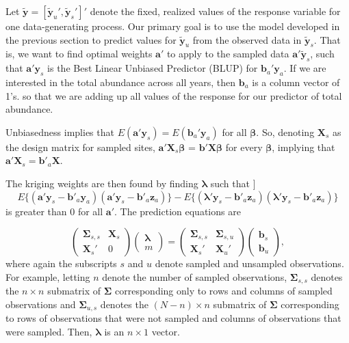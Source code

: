 \documentclass[]{interact}
\theoremstyle{plain}%
\theoremstyle{definition}
\theoremstyle{remark}
\begin{document}
Let
\(\mathbf{\tilde{y}} = [\mathbf{\tilde{y}}_u', \mathbf{\tilde{y}}_s']'\)
denote the fixed, realized values of the response variable for one
data-generating process. Our primary goal is to use the model developed
in the previous section to predict values for \(\mathbf{\tilde{y}}_{u}\)
from the observed data in \(\mathbf{\tilde{y}}_{s}\). That is, we want
to find optimal weights \(\mathbf{a}'\) to apply to the sampled data
\(\mathbf{a}' \mathbf{\tilde{y}}_s\), such that
\(\mathbf{a}' \mathbf{y}_s\) is the Best Linear Unbiased Predictor
(BLUP) for \(\mathbf{b}_a' \mathbf{y}_a\). If we are interested in the
total abundance across all years, then \(\mathbf{b}_a\) is a column
vector of 1's. so that we are adding up all values of the response for
our predictor of total abundance.

Unbiasedness implies that
\(E(\mathbf{a'}\mathbf{y}_s) = E(\mathbf{b}_a'\mathbf{y}_a)\) for all
\(\bm{\beta}\). So, denoting \(\mathbf{X}_s\) as the design matrix for
sampled sites, \(\mathbf{a'} \mathbf{X}_s \bm{\beta}\) =
\(\mathbf{b'} \mathbf{X} \bm{\beta}\) for every \(\bm{\beta}\), implying
that \(\mathbf{a'} \mathbf{X}_s = \mathbf{b'}_a \mathbf{X}\).

The kriging weights are then found by finding \(\bm{\lambda}\) such that
\mbox{]} \begin{equation}
E\{(\mathbf{a'}\mathbf{y}_s - \mathbf{b'}_a \mathbf{y}_a)(\mathbf{a'}\mathbf{y}_s - \mathbf{b'}_a \mathbf{z}_a)\} - E\{(\bm{\lambda'}\mathbf{y}_s - \mathbf{b'}_a \mathbf{z}_a)(\bm{\lambda}'\mathbf{y}_s - \mathbf{b'}_a \mathbf{z}_a)\}
\end{equation} \noindent is greater than 0 for all \(\mathbf{a'}\). The
prediction equations are

\begin{equation}
\begin{pmatrix}
\bm{\Sigma}_{s, s} & \mathbf{X}_s \\
\mathbf{X}_s' & 0
\end{pmatrix} 
\begin{pmatrix}
\bm{\lambda} \\
m
\end{pmatrix} = 
\begin{pmatrix}
\bm{\Sigma}_{s, s} & \bm{\Sigma}_{s, u} \\
\mathbf{X}_{s}' & \mathbf{X}_{u}'
\end{pmatrix} 
\begin{pmatrix}
\mathbf{b}_{s} \\
\mathbf{b}_{u}
\end{pmatrix},
\end{equation} \noindent where again the subscripts \(s\) and \(u\)
denote sampled and unsampled observations. For example, letting \(n\)
denote the number of sampled observations, \(\bm{\Sigma}_{s, s}\)
denotes the \(n \times n\) submatrix of \(\bm{\Sigma}\) corresponding
only to rows and columns of sampled observations and
\(\bm{\Sigma}_{u, s}\) denotes the \((N - n) \times n\) submatrix of
\(\bm{\Sigma}\) corresponding to rows of observations that were not
sampled and columns of observations that were sampled. Then,
\(\bm{\lambda}\) is an \(n \times 1\) vector.
\end{document}
